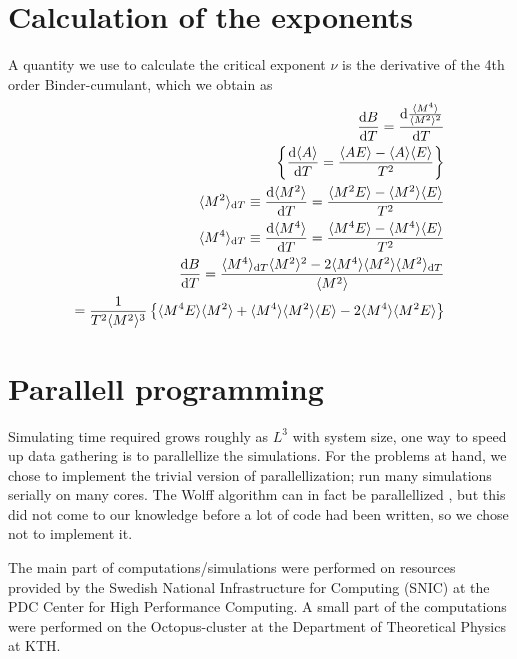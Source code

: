 \section{Calculation of the exponents}
A quantity we use to calculate the critical exponent $\nu$ is the derivative of the 4th order Binder-cumulant, which we obtain as 
\begin{align}
  \frac{\textrm{d} B}{\textrm{d} T} = \frac{\textrm{d} \frac{\langle M^4\rangle}{\langle M^2 \rangle^2}}{\textrm{d} T} \\
  \left\{\frac{\textrm{d} \langle A\rangle }{\textrm{d} T} = \frac{\langle A E\rangle  - \langle A\rangle \langle E\rangle }{T^2}\right\} \\
  \langle M^2\rangle _{\textrm{d} T} \equiv \frac{\textrm{d} \langle M^2\rangle }{\textrm{d} T} = \frac{\langle M^2E\rangle  - \langle M^2\rangle \langle E\rangle }{T^2} \\
  \langle M^4\rangle _{\textrm{d} T} \equiv \frac{\textrm{d} \langle M^4\rangle }{\textrm{d} T} = \frac{\langle M^4 E\rangle  - \langle M^4\rangle \langle E\rangle }{T^2} \\
  \frac{\textrm{d} B}{\textrm{d} T} = \frac{\langle M^4\rangle _{\textrm{d} T}\langle M^2\rangle ^2 - 2\langle M^4\rangle \langle M^2\rangle \langle M^2\rangle _{\textrm{d} T}}{\langle M^2\rangle } \\
  = \frac{1}{T^2 \langle M^2\rangle ^3}\left\{\langle M^4 E\rangle \langle M^2\rangle  + \langle M^4\rangle \langle M^2\rangle \langle E\rangle  - 2\langle M^4\rangle \langle M^2E\rangle \right\}
\end{align}

\section{Parallell programming}
Simulating time required grows roughly as $L^3$ with system size, one way to speed up data gathering is to parallellize the simulations.
For the problems at hand, we chose to implement the trivial version of parallellization; run many simulations serially on many cores.
The Wolff algorithm can in fact be parallellized \cite{Kaupuzs2010}, but this did not come to our knowledge before a lot of code had been written, so we chose not to implement it. 

The main part of computations/simulations were performed on resources provided by the Swedish National Infrastructure for Computing (SNIC) at the PDC Center for High Performance Computing.
A small part of the computations were performed on the Octopus-cluster at the Department of Theoretical Physics at KTH.

